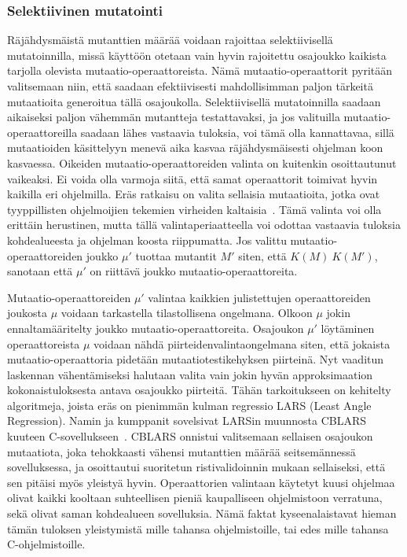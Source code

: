\documentclass{tktltiki}
\begin{document}
\subsubsection{Selektiivinen mutatointi}
Räjähdysmäistä mutanttien määrää voidaan rajoittaa selektiivisellä mutatoinnilla, missä käyttöön otetaan vain hyvin rajoitettu osajoukko kaikista tarjolla olevista mutaatio-operaattoreista. Nämä mutaatio-operaattorit pyritään valitsemaan niin, että saadaan efektiivisesti mahdollisimman paljon tärkeitä mutaatioita generoitua tällä osajoukolla. Selektiivisellä mutatoinnilla saadaan aikaiseksi paljon vähemmän mutantteja testattavaksi, ja jos valituilla mutaatio-operaattoreilla saadaan lähes vastaavia tuloksia, voi tämä olla kannattavaa, sillä mutaatioiden käsittelyyn menevä aika kasvaa räjähdysmäisesti ohjelman koon kasvaessa. Oikeiden mutaatio-operaattoreiden valinta on kuitenkin osoittautunut vaikeaksi. Ei voida olla varmoja siitä, että samat operaattorit toimivat hyvin kaikilla eri ohjelmilla. Eräs ratkaisu on valita sellaisia mutaatioita, jotka ovat tyyppillisten ohjelmoijien tekemien virheiden kaltaisia~\cite{}. Tämä valinta voi olla erittäin herustinen, mutta tällä valintaperiaatteella voi odottaa vastaavia tuloksia kohdealueesta ja ohjelman koosta riippumatta. Jos valittu mutaatio-operaattoreiden joukko $\mu'$ tuottaa mutantit $M'$ siten, että $K(M) ~ K(M')$, sanotaan että $\mu'$ on riittävä joukko mutaatio-operaattoreita. 

Mutaatio-operaattoreiden $\mu'$ valintaa kaikkien julistettujen operaattoreiden joukosta $\mu$ voidaan tarkastella tilastollisena ongelmana. Olkoon $\mu$ jokin ennaltamääritelty joukko mutaatio-operaattoreita. Osajoukon $\mu'$ löytäminen operaattoreista $\mu$ voidaan nähdä piirteidenvalintaongelmana siten, että jokaista mutaatio-operaattoria pidetään mutaatiotestikehyksen piirteinä. Nyt vaaditun laskennan vähentämiseksi halutaan valita vain jokin hyvän approksimaation kokonaistuloksesta antava osajoukko piirteitä. Tähän tarkoitukseen on kehitelty algoritmeja, joista eräs on pienimmän kulman regressio LARS (Least Angle Regression). Namin ja kumppanit sovelsivat LARSin muunnosta CBLARS kuuteen C-sovellukseen~\cite{}. CBLARS onnistui valitsemaan sellaisen osajoukon mutaatiota, joka tehokkaasti vähensi mutanttien määrää seitsemännessä sovelluksessa, ja osoittautui suoritetun ristivalidoinnin mukaan sellaiseksi, että sen pitäisi myös yleistyä hyvin. Operaattorien valintaan käytetyt kuusi ohjelmaa olivat kaikki kooltaan suhteellisen pieniä kaupalliseen ohjelmistoon verratuna, sekä olivat saman kohdealueen sovelluksia. Nämä faktat kyseenalaistavat hieman tämän tuloksen yleistymistä mille tahansa ohjelmistoille, tai edes mille tahansa C-ohjelmistoille. 
\end{document}
